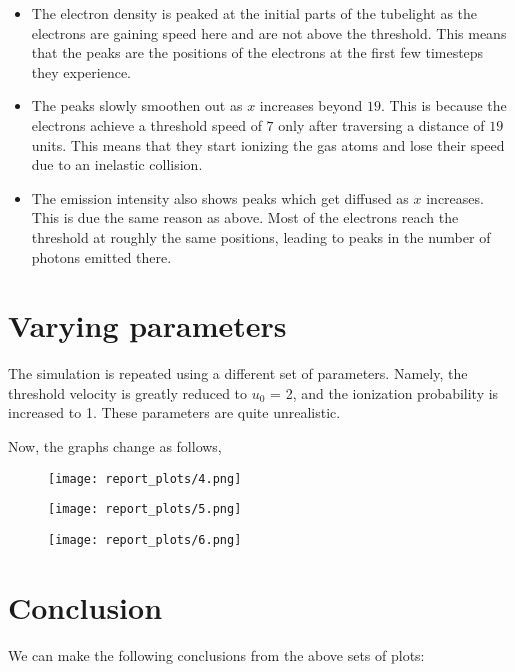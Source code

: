 \documentclass{article}
\begin{document}
\begin{itemize}
\item
  The electron density is peaked at the initial parts of the tubelight
  as the electrons are gaining speed here and are not above the
  threshold. This means that the peaks are the positions of the
  electrons at the first few timesteps they experience.
\item
  The peaks slowly smoothen out as \(x\) increases beyond \(19\). This
  is because the electrons achieve a threshold speed of \(7\) only after
  traversing a distance of \(19\) units. This means that they start
  ionizing the gas atoms and lose their speed due to an inelastic
  collision.
\item
  The emission intensity also shows peaks which get diffused as \(x\)
  increases. This is due the same reason as above. Most of the electrons
  reach the threshold at roughly the same positions, leading to peaks in
  the number of photons emitted there.

\end{itemize}



\section{Varying parameters}

The simulation is repeated using a different set of parameters. Namely, the threshold velocity is
greatly reduced to $u_{0}$ = 2, and the ionization probability is increased to 1. These parameters are quite unrealistic.

Now, the graphs change as follows,

\begin{figure}[!tbh]
    \centering
    \texttt{[image: report\_plots/4.png]}
\end{figure}
\begin{figure}[!tbh]
    \centering
    \texttt{[image: report\_plots/5.png]}
\end{figure}
\begin{figure}[!tbh]
    \centering
    \texttt{[image: report\_plots/6.png]}
\end{figure}\newpage

		
\section{Conclusion}\label{conclusion}

We can make the following conclusions from the above sets of plots:
\end{document}
